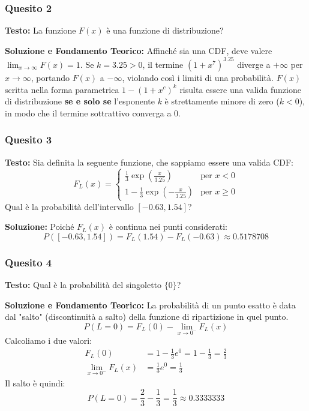 \documentclass[12pt, a4paper]{article}
\begin{document}
\subsubsection*{Quesito 2}
\textbf{Testo:} La funzione $F(x)$ è una funzione di distribuzione?

\textbf{Soluzione e Fondamento Teorico:}
Affinché sia una CDF, deve valere $\lim_{x \to \infty} F(x) = 1$. 
Se $k = 3.25 > 0$, il termine $(1+x^7)^{3.25}$ diverge a $+\infty$ per $x \to \infty$, portando $F(x)$ a $-\infty$, violando così i limiti di una probabilità.
$F(x)$ scritta nella forma parametrica $1 - (1+x^c)^k$ risulta essere una valida funzione di distribuzione \textbf{se e solo se} l'esponente $k$ è strettamente minore di zero ($k < 0$), in modo che il termine sottrattivo converga a 0.

\subsubsection*{Quesito 3}
\textbf{Testo:} Sia definita la seguente funzione, che sappiamo essere una valida CDF:
$$
F_L(x) = 
\begin{cases} 
\frac{1}{3} \exp\left(\frac{x}{3.25}\right) & \text{per } x < 0 \\
1 - \frac{1}{3} \exp\left(-\frac{x}{3.25}\right) & \text{per } x \ge 0
\end{cases}
$$
Qual è la probabilità dell'intervallo $[-0.63, 1.54]$?

\textbf{Soluzione:}
Poiché $F_L(x)$ è continua nei punti considerati:
$$P([-0.63, 1.54]) = F_L(1.54) - F_L(-0.63) \approx 0.5178708$$

\subsubsection*{Quesito 4}
\textbf{Testo:} Qual è la probabilità del singoletto $\{0\}$?

\textbf{Soluzione e Fondamento Teorico:}
La probabilità di un punto esatto è data dal "salto" (discontinuità a salto) della funzione di ripartizione in quel punto.
$$P(L=0) = F_L(0) - \lim_{x \to 0^-} F_L(x)$$
Calcoliamo i due valori:
\begin{align*}
F_L(0) &= 1 - \frac{1}{3} e^0 = 1 - \frac{1}{3} = \frac{2}{3} \\
\lim_{x \to 0^-} F_L(x) &= \frac{1}{3} e^0 = \frac{1}{3}
\end{align*}
Il salto è quindi:
$$P(L=0) = \frac{2}{3} - \frac{1}{3} = \frac{1}{3} \approx 0.3333333$$
\end{document}
